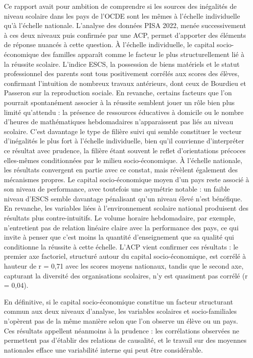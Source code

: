 \documentclass[
  french,
  11pt,
  a4paper,
]{report}
\begin{document}
Ce rapport avait pour ambition de comprendre si les sources des
inégalités de niveau scolaire dans les pays de l'OCDE sont les mêmes à
l'échelle individuelle qu'à l'échelle nationale. L'analyse des données
PISA 2022, menée successivement à ces deux niveaux puis confirmée par
une ACP, permet d'apporter des éléments de réponse nuancés à cette
question. À l'échelle individuelle, le capital socio-économique des
familles apparaît comme le facteur le plus structurellement lié à la
réussite scolaire. L'indice ESCS, la possession de biens matériels et le
statut professionnel des parents sont tous positivement corrélés aux
scores des élèves, confirmant l'intuition de nombreux travaux
antérieurs, dont ceux de Bourdieu et Passeron sur la reproduction
sociale. En revanche, certains facteurs que l'on pourrait spontanément
associer à la réussite semblent jouer un rôle bien plus limité
qu'attendu : la présence de ressources éducatives à domicile ou le
nombre d'heures de mathématiques hebdomadaires n'apparaissent pas liés
au niveau scolaire. C'est davantage le type de filière suivi qui semble
constituer le vecteur d'inégalités le plus fort à l'échelle
individuelle, bien qu'il convienne d'interpréter ce résultat avec
prudence, la filière étant souvent le reflet d'orientations précoces
elles-mêmes conditionnées par le milieu socio-économique. À l'échelle
nationale, les résultats convergent en partie avec ce constat, mais
révèlent également des mécanismes propres. Le capital socio-économique
moyen d'un pays reste associé à son niveau de performance, avec
toutefois une asymétrie notable : un faible niveau d'ESCS semble
davantage pénalisant qu'un niveau élevé n'est bénéfique. En revanche,
les variables liées à l'environnement scolaire national produisent des
résultats plus contre-intuitifs. Le volume horaire hebdomadaire, par
exemple, n'entretient pas de relation linéaire claire avec la
performance des pays, ce qui invite à penser que c'est moins la quantité
d'enseignement que sa qualité qui conditionne la réussite à cette
échelle. L'ACP vient confirmer ces résultats : le premier axe factoriel,
structuré autour du capital socio-économique, est corrélé à hauteur de r
= 0,71 avec les scores moyens nationaux, tandis que le second axe,
capturant la diversité des organisations scolaires, n'y est quasiment
pas corrélé (r = 0,04).

En définitive, si le capital socio-économique constitue un facteur
structurant commun aux deux niveaux d'analyse, les variables scolaires
et socio-familiales n'opèrent pas de la même manière selon que l'on
observe un élève ou un pays. Ces résultats appellent néanmoins à la
prudence : les corrélations observées ne permettent pas d'établir des
relations de causalité, et le travail sur des moyennes nationales efface
une variabilité interne qui peut être considérable.
\end{document}
